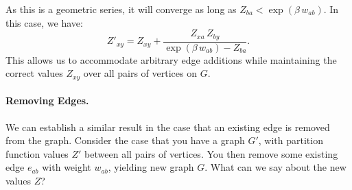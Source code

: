 As this is a geometric series, it will converge as long as
$Z_{ba} < \exp(\beta \, w_{ab})$.
In this case,
we have:
\begin{equation}
   Z'_{xy} = Z_{xy} + \frac{Z_{xa} \, Z_{by}}{\exp(\beta \, w_{ab}) - Z_{ba}}.
   \label{eqn:partition:addition}
\end{equation}
This allows us to accommodate arbitrary edge additions while maintaining
the correct values $Z_{xy}$ over all pairs of vertices on $G$.

\paragraph{Removing Edges.}
We can establish a similar result in the case that an existing edge
is removed from the graph.
Consider the case that you have a graph $G'$,
with partition function values $Z'$ between all pairs of vertices.
You then remove some existing edge $e_{ab}$ with weight $w_{ab}$,
yielding new graph $G$.
What can we say about the new values $Z$?

